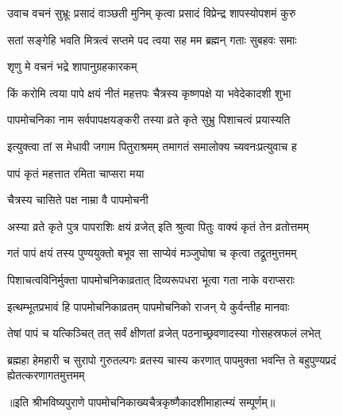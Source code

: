 \twolineshloka
{उवाच वचनं सुभ्रूः प्रसादं वाञ्छती मुनिम्}
{कृत्वा प्रसादं विप्रेन्द्र शापस्योपशमं कुरु} %

\twolineshloka
{सतां सङ्गेहि भवति मित्रत्वं सप्तमे पद}
{त्वया सह मम ब्रह्मन् गताः सुबहवः समाः} %



\onelineshloka
{शृणु मे वचनं भद्रे शापानुग्रहकारकम्} %

\twolineshloka
{किं करोमि त्वया पापे क्षयं नीतं महत्तपः}
{चैत्रस्य कृष्णपक्षे या भवेदेकादशी शुभा} %

\twolineshloka
{पापमोचनिका नाम सर्वपापक्षयङ्करी}
{तस्या व्रते कृते सुभ्रु पिशाचत्वं प्रयास्यति} %

\twolineshloka
{इत्युक्त्वा तां स मेधावी जगाम पितुराश्रमम्}
{तमागतं समालोक्य च्यवनःप्रत्युवाच ह} %



\onelineshloka
{पापं कृतं महत्तात रमिता चाप्सरा मया} %



\onelineshloka
{चैत्रस्य चासिते पक्ष नाम्रा वै पापमोचनी} %

\twolineshloka
{अस्या व्रते कृते पुत्र पापराशिः क्षयं व्रजेत्}
{इति श्रुत्वा पितुः वाक्यं कृतं तेन व्रतोत्तमम्} %

\twolineshloka
{गतं पापं क्षयं तस्य पुण्ययुक्तो बभूव सा}
{साप्येवं मञ्जुघोषा च कृत्वा तद्रूतमुत्तमम्} %

\twolineshloka
{पिशाचत्वविनिर्मुक्ता पापमोचनिकाव्रतात्}
{दिव्यरूपधरा भूत्वा गता नाके वराप्सराः} %


\twolineshloka
{इत्थम्भूतप्रभावं हि पापमोचनिकाव्रतम्}
{पापमोचनिको राजन् ये कुर्वन्तीह मानवाः} %

\twolineshloka
{तेषां पापं च यत्किञ्चित् तत् सर्वं क्षीणतां व्रजेत्}
{पठनाच्छ्रवणादस्या गोसहस्रफलं लभेत्} %


\threelineshloka
{ब्रह्महा हेमहारी च सुरापो गुरुतल्पगः}
{व्रतस्य चास्य करणात् पापमुक्ता भवन्ति ते}
{बहुपुण्यप्रदं ह्येतत्करणागतमुत्तमम्} %

॥इति श्रीभविष्यपुराणे पापमोचनिकाख्यचैत्रकृष्णैकादशीमाहात्म्यं सम्पूर्णम्॥


